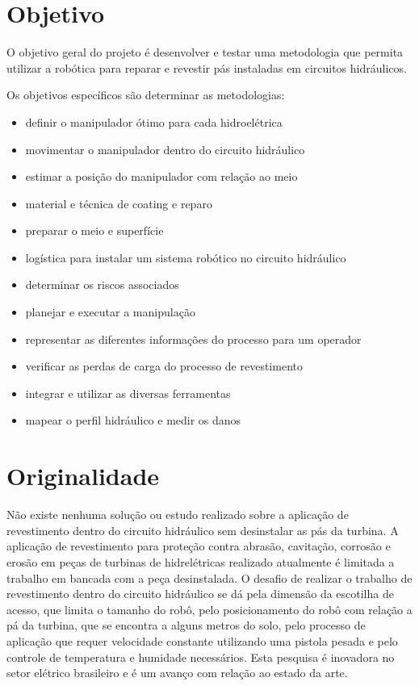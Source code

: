 \section{Objetivo}

O objetivo geral do projeto é desenvolver e testar uma metodologia que permita
utilizar a robótica para reparar e revestir pás instaladas em circuitos hidráulicos.

Os objetivos específicos são determinar as metodologias: 

\begin{itemize}
  \item definir o manipulador ótimo para cada hidroelétrica 
  \item movimentar o manipulador dentro do circuito hidráulico
  \item estimar a posição do manipulador com relação ao meio
  \item material e técnica de coating e reparo 
  \item preparar o meio e superfície
  \item logística para instalar um sistema robótico no circuito hidráulico
  \item determinar os riscos associados
  \item planejar e executar a manipulação
  \item representar as diferentes informações do processo para um operador
  \item verificar as perdas de carga do processo de revestimento
  \item integrar e utilizar as diversas ferramentas
  \item mapear o perfil hidráulico e medir os danos
\end{itemize}

\section{Originalidade}

Não existe nenhuma solução ou estudo realizado sobre a aplicação de revestimento
dentro do circuito hidráulico sem desinstalar as pás da turbina. A aplicação de
revestimento para proteção contra abrasão, cavitação, corrosão e erosão em peças
de turbinas de hidrelétricas realizado atualmente é limitada a trabalho em
bancada com a peça desinstalada. O desafio de realizar o trabalho de
revestimento dentro do circuito hidráulico se dá pela dimensão da escotilha de
acesso, que limita o tamanho do robô, pelo posicionamento do robô com relação a
pá da turbina, que se encontra a alguns metros do solo, pelo processo de
aplicação que requer velocidade constante utilizando uma pistola pesada e pelo
controle de temperatura e humidade necessários. Esta pesquisa é inovadora no
setor elétrico brasileiro e é um avanço com relação ao estado da arte.

